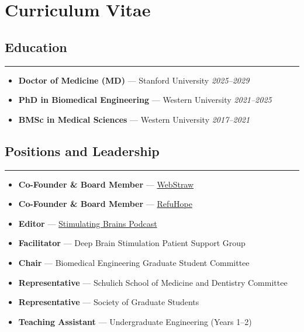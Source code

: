 \chapter*{Curriculum Vitae}

\newcommand{\sectionline}{\noindent\rule{\linewidth}{0.4pt}}

\section*{Education} \sectionline
\begin{itemize}
  \item \textbf{Doctor of Medicine (MD)} — Stanford University \hfill \textit{2025–2029}
  \item \textbf{PhD in Biomedical Engineering} — Western University \hfill \textit{2021–2025}
  \item \textbf{BMSc in Medical Sciences} — Western University \hfill \textit{2017–2021}
\end{itemize}

\section*{Positions and Leadership} \sectionline
\begin{itemize}
  \item \textbf{Co-Founder \& Board Member} — \href{https://webstraw.ca}{WebStraw}
  \item \textbf{Co-Founder \& Board Member} — \href{https://refuhope.com}{RefuHope}
  \item \textbf{Editor} — \href{https://stimulatingbrains.org}{Stimulating Brains Podcast}
  \item \textbf{Facilitator} — Deep Brain Stimulation Patient Support Group
  \item \textbf{Chair} — Biomedical Engineering Graduate Student Committee
  \item \textbf{Representative} — Schulich School of Medicine and Dentistry Committee
  \item \textbf{Representative} — Society of Graduate Students
  \item \textbf{Teaching Assistant} — Undergraduate Engineering (Years 1–2)
\end{itemize}

